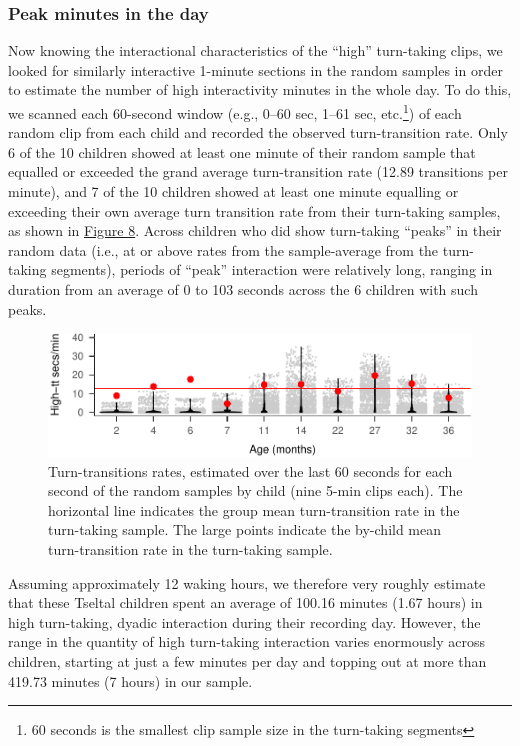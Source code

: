 \documentclass[floatsintext,man]{apa6}
\theoremstyle{definition}
\theoremstyle{definition}
\theoremstyle{definition}
\theoremstyle{remark}
\begin{document}
\subsubsection{Peak minutes in the day}\label{peak-minutes-in-the-day}

Now knowing the interactional characteristics of the \enquote{high}
turn-taking clips, we looked for similarly interactive 1-minute sections
in the random samples in order to estimate the number of high
interactivity minutes in the whole day. To do this, we scanned each
60-second window (e.g., 0--60 sec, 1--61 sec, etc.\footnote{60 seconds
  is the smallest clip sample size in the turn-taking segments}) of each
random clip from each child and recorded the observed turn-transition
rate. Only 6 of the 10 children showed at least one minute of their
random sample that equalled or exceeded the grand average
turn-transition rate (12.89 transitions per minute), and 7 of the 10
children showed at least one minute equalling or exceeding their own
average turn transition rate from their turn-taking samples, as shown in
\protect\hyperlink{fig8}{Figure 8}. Across children who did show
turn-taking \enquote{peaks} in their random data (i.e., at or above
rates from the sample-average from the turn-taking segments), periods of
\enquote{peak} interaction were relatively long, ranging in duration
from an average of 0 to 103 seconds across the 6 children with such
peaks.

\begin{figure}
\centering
\includegraphics{Tseltal-CLE_files/figure-latex/fig8-1.pdf}
\caption{\label{fig:fig8}Turn-transitions rates, estimated over the last 60
seconds for each second of the random samples by child (nine 5-min clips
each). The horizontal line indicates the group mean turn-transition rate
in the turn-taking sample. The large points indicate the by-child mean
turn-transition rate in the turn-taking sample.}
\end{figure}

Assuming approximately 12 waking hours, we therefore very roughly
estimate that these Tseltal children spent an average of 100.16 minutes
(1.67 hours) in high turn-taking, dyadic interaction during their
recording day. However, the range in the quantity of high turn-taking
interaction varies enormously across children, starting at just a few
minutes per day and topping out at more than 419.73 minutes (7 hours) in
our sample.
\end{document}
